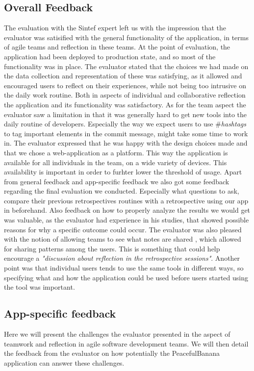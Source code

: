 \subsection{Overall Feedback}
The evaluation with the Sintef expert left us with the impression that the evaluator was satisified with the general functionality of the application, in terms of agile teams and reflection in these teams. 
At the point of evaluation, the application had been deployed to production state, and so most of the functionality was in place. The evaluator stated that the choices we had made on the data collection and representation of these was satisfying, as it allowed and encouraged users to reflect on their experiences, while not being too intrusive on the daily work routine. Both in aspects of individual and collaborative reflection the application and its functionality was satisfactory. As for the team aspect the evaluator saw a limitation in that it was generally hard to get new tools into the daily routine of developers. Especially the way we expect users to use \#\emph{hashtags} to tag important elements in the commit message, might take some time to work in. The evaluator expressed that he was happy with the design choices made and that we chose a web-application as a platform. This way the application is available for all individuals in the team, on a wide variety of devices. This availability is important in order to furhter lower the threshold of usage. Apart from general feedback and app-specific feedback we also got some feedback regarding the final evaluation we conducted. Especially what questions to ask, compare their previous retrospectives routines with a retrospective using our app in beforehand. Also feedback on how to properly analyze the results we would get was valuable, as the evaluator had experience in his studies, that showed possible reasons for why a specific outcome could occur. The evaluator was also pleased with the notion of allowing teams to see what notes are shared , which allowed for sharing patterns among the users. This is something that could help encourage a \emph{"discussion about reflection in the retrospective sessions"}. Another point was that individual users tends to use the same tools in different ways, so specifying what and how the application could be used before users started using the tool was important. \\ 

\subsection{App-specific feedback}
Here we will present the challenges the evaluator presented in the aspect of teamwork and reflection in agile software development teams. We will then detail the feedback from the evaluator on how potentially the PeacefulBanana application can answer these challenges. 

